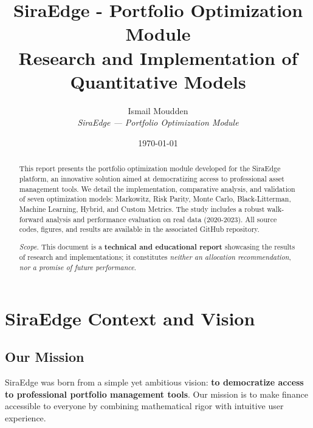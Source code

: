 \documentclass[11pt,a4paper]{article}
\begin{document}
\title{\textbf{SiraEdge - Portfolio Optimization Module}\\[0.9em]
\large{Research and Implementation of Quantitative Models}}

\author{Ismail Moudden\\[0.6em]
\textit{SiraEdge — Portfolio Optimization Module}}

\date{\today}

\begin{titlepage}
\thispagestyle{empty}
\maketitle
\vspace{2em}

\begin{abstract}
This report presents the portfolio optimization module developed for the SiraEdge platform, an innovative solution aimed at democratizing access to professional asset management tools. We detail the implementation, comparative analysis, and validation of seven optimization models: Markowitz, Risk Parity, Monte Carlo, Black-Litterman, Machine Learning, Hybrid, and Custom Metrics. The study includes a robust walk-forward analysis and performance evaluation on real data (2020-2023). All source codes, figures, and results are available in the associated GitHub repository.
\medskip\par\noindent\textit{Scope.} This document is a \textbf{technical and educational report} showcasing the results of research and implementations; it constitutes \emph{neither an allocation recommendation}, \emph{nor a promise of future performance}.
\end{abstract}

\vfill
\end{titlepage}

\section*{SiraEdge Context and Vision}

\subsection*{Our Mission}
SiraEdge was born from a simple yet ambitious vision: \textbf{to democratize access to professional portfolio management tools}. Our mission is to make finance accessible to everyone by combining mathematical rigor with intuitive user experience.
\end{document}
